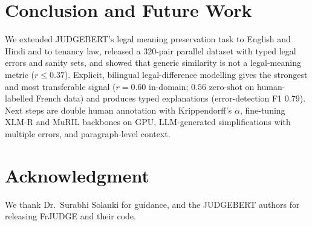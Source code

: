 \section{Conclusion and Future Work}
We extended JUDGEBERT's legal meaning preservation task to English and Hindi and to tenancy law, released a 320-pair parallel dataset with typed legal errors and sanity sets, and showed that generic similarity is not a legal-meaning metric ($r\le0.37$). Explicit, bilingual legal-difference modelling gives the strongest and most transferable signal ($r=0.60$ in-domain; $0.56$ zero-shot on human-labelled French data) and produces typed explanations (error-detection F1 $0.79$). Next steps are double human annotation with Krippendorff's $\alpha$, fine-tuning XLM-R and MuRIL backbones on GPU, LLM-generated simplifications with multiple errors, and paragraph-level context.

\section*{Acknowledgment}
We thank Dr.\ Surabhi Solanki for guidance, and the JUDGEBERT authors for releasing FrJUDGE and their code.
